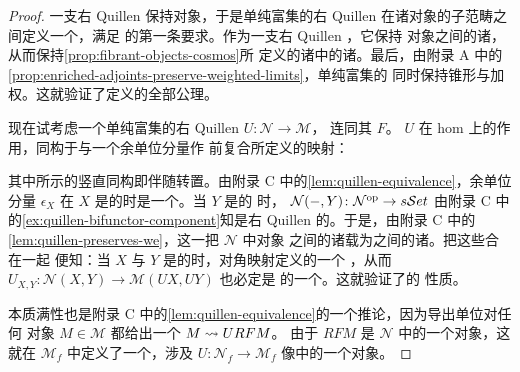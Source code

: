 \begin{proof}
一支右 Quillen \trAdjunction{}保持\trFibrant{}对象，于是单纯富集的右 Quillen
\trAdjunction{}在诸\trFibrant{}对象的子范畴之间定义一个\trSimplicialFunctor，满足%
\trCosmologicalFunctor{}的第一条要求。作为一支右 Quillen \trFunctor，它保持%
\trFibrant{}对象之间的诸\trFibration，从而保持\cref{prop:fibrant-objects-cosmos}所
定义的诸\trInfinityCosmos{}中的诸\trIsofibration。最后，由附录 A 中的%
\cref{prop:enriched-adjoints-preserve-weighted-limits}，单纯富集的\trRightAdjoint{}%
同时保持锥形\trLimit{}与加权\trLimit。这就验证了定义\trCosmologicalFunctor{}的全部公理。

现在试考虑一个单纯富集的右 Quillen \trEquivalence{} $U\colon\mathcal{N}\to\mathcal{M}$，
连同其\trLeftAdjoint{} $F$。\trFunctor{} $U$ 在 hom 上的作用，同构于与一个余单位分量作
前复合所定义的映射：
\begin{center}
\end{center}
其中所示的竖直同构即伴随转置。由附录 C 中的\cref{lem:quillen-equivalence}，余单位分量
$\epsilon_X$ 在 $X$ 是\trFibrant{}的时是一个\trWeakEquivalence。当 $Y$ 是\trFibrant{}的
时，\trFunctor{} $\mathcal{N}(-,Y)\colon\mathcal{N}^{\mathrm{op}}\to s\mathcal{S}et$ 由附录 C 中
的\cref{ex:quillen-bifunctor-component}知是右 Quillen 的。于是，由附录 C 中的%
\cref{lem:quillen-preserves-we}，这一\trFunctor{}把 $\mathcal{N}$ 中\trCofibrant{}对象
之间的诸\trWeakEquivalence{}载为\trQuasiCategory{}之间的诸\trEquivalence。把这些合在一起
便知：当 $X$ 与 $Y$ 是\trFibrant{}的时，对角映射定义\trQuasiCategory{}的一个%
\trEquivalence，从而 $U_{X,Y}\colon\mathcal{N}(X,Y)\to\mathcal{M}(UX,UY)$ 也必定是%
\trQuasiCategory{}的一个\trEquivalence。这就验证了\trCosmologicalBiequivalence{}的%
\trLocalEquivalence{}性质。

本质满性也是附录 C 中的\cref{lem:quillen-equivalence}的一个推论，因为导出单位对任何%
\trFibrant{}对象 $M\in\mathcal{M}$ 都给出一个\trWeakEquivalence{} $M\rightsquigarrow URFM$。
由于 $RFM$ 是 $\mathcal{N}$ 中的一个\trFibrant{}对象，这就在\trInfinityCosmos{}
$\mathcal{M}_{f}$ 中定义了一个\trEquivalence，涉及 $U\colon\mathcal{N}_{f}\to\mathcal{M}_{f}$
像中的一个对象。
\end{proof}

